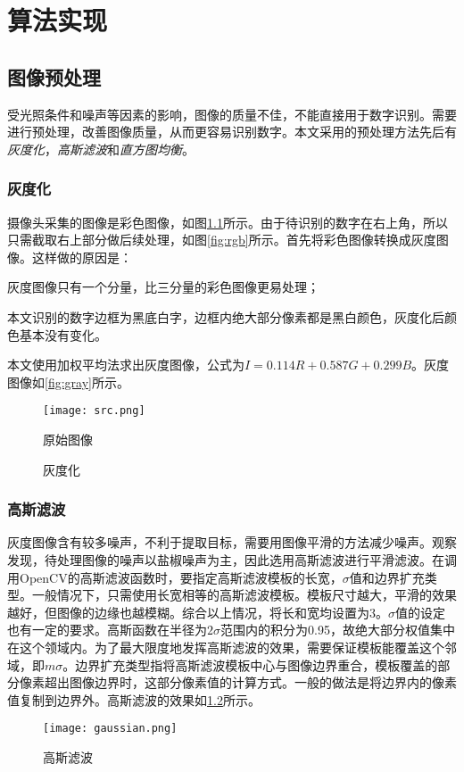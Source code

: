 
\chapter{算法实现}

\section{图像预处理}

受光照条件和噪声等因素的影响，图像的质量不佳，不能直接用于数字识别。需要进行预处理，改善图像质量，从而更容易识别数字。本文采用的预处理方法先后有\emph{灰度化}，\emph{高斯滤波}和\emph{直方图均衡}。

\subsection{灰度化}



摄像头采集的图像是彩色图像，如图\ref{fig:src}所示。由于待识别的数字在右上角，所以只需截取右上部分做后续处理，如图\ref{fig:rgb}所示。首先将彩色图像转换成灰度图像。这样做的原因是：
\begin{asparaenum}[(1)]
\item 灰度图像只有一个分量，比三分量的彩色图像更易处理；
\item 本文识别的数字边框为黑底白字，边框内绝大部分像素都是黑白颜色，灰度化后颜色基本没有变化。
\end{asparaenum}

本文使用加权平均法求出灰度图像，公式为$I=0.114R+0.587G+0.299B$。灰度图像如\ref{fig:gray}所示。
\begin{figure}[h]
  \centering
  \texttt{[image: src.png]}
  \caption{原始图像}
  \label{fig:src}
\end{figure}
\begin{figure}[h]
  \centering
  \hspace{1in}
  \caption{灰度化}
\end{figure}

\subsection{高斯滤波}


灰度图像含有较多噪声，不利于提取目标，需要用图像平滑的方法减少噪声。观察发现，待处理图像的噪声以盐椒噪声为主，因此选用高斯滤波进行平滑滤波。在调用OpenCV的高斯滤波函数时，要指定高斯滤波模板的长宽，$\sigma$值和边界扩充类型。一般情况下，只需使用长宽相等的高斯滤波模板。模板尺寸越大，平滑的效果越好，但图像的边缘也越模糊。综合以上情况，将长和宽均设置为3。$\sigma$值的设定也有一定的要求。高斯函数在半径为$2\sigma$范围内的积分为0.95，故绝大部分权值集中在这个领域内。为了最大限度地发挥高斯滤波的效果，需要保证模板能覆盖这个邻域，即$m\sigma$。边界扩充类型指将高斯滤波模板中心与图像边界重合，模板覆盖的部分像素超出图像边界时，这部分像素值的计算方式。一般的做法是将边界内的像素值复制到边界外。高斯滤波的效果如\ref{fig:gauss}所示。
\begin{figure}[h]
  \centering
  \texttt{[image: gaussian.png]}
  \caption{高斯滤波}
  \label{fig:gauss}
\end{figure}

